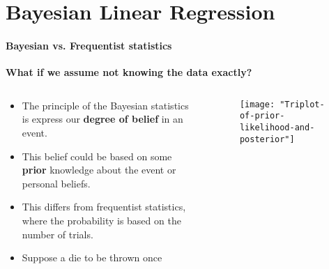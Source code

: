 \section{Bayesian Linear Regression}

\framecard{\insertsection}

\begin{frame}{\insertsection}
	\framesubtitle{Bayesian vs. Frequentist statistics}
	
	\textcolor{UniGold}{\textbf{What if we assume not knowing the data exactly?}}

	\begin{columns}
		\begin{column}{0.475\textwidth}
			\begin{itemize}
				\item The principle of the Bayesian statistics is express our \textcolor{UniOrange}{\textbf{degree of belief}} in an event.
				\item This belief could be based on some \textcolor{UniOrange}{\textbf{prior}} knowledge about the event or personal beliefs.
				\item This differs from frequentist statistics, where the probability is based on the number of trials.
				\item Suppose a die to be thrown once
			\end{itemize}
			\end{column}
			\begin{column}{0.475\textwidth}   
				\centering
				\begin{figure}
					\texttt{[image: "Triplot-of-prior-likelihood-and-posterior"]}
				\caption{\cite{AksuAnil2018}}
				\end{figure}
			\end{column}
		\end{columns}
\end{frame}
	
